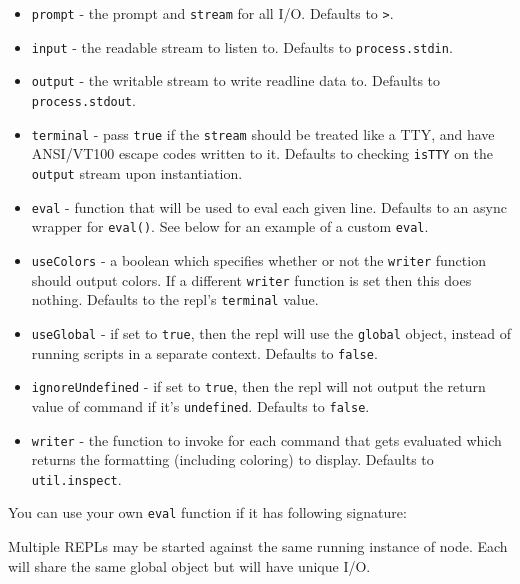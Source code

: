 \begin{itemize}
\item
  \texttt{prompt} - the prompt and \texttt{stream} for all I/O. Defaults
  to \texttt{\textgreater{}}.
\item
  \texttt{input} - the readable stream to listen to. Defaults to
  \texttt{process.stdin}.
\item
  \texttt{output} - the writable stream to write readline data to.
  Defaults to \texttt{process.stdout}.
\item
  \texttt{terminal} - pass \texttt{true} if the \texttt{stream} should
  be treated like a TTY, and have ANSI/VT100 escape codes written to it.
  Defaults to checking \texttt{isTTY} on the \texttt{output} stream upon
  instantiation.
\item
  \texttt{eval} - function that will be used to eval each given line.
  Defaults to an async wrapper for \texttt{eval()}. See below for an
  example of a custom \texttt{eval}.
\item
  \texttt{useColors} - a boolean which specifies whether or not the
  \texttt{writer} function should output colors. If a different
  \texttt{writer} function is set then this does nothing. Defaults to
  the repl's \texttt{terminal} value.
\item
  \texttt{useGlobal} - if set to \texttt{true}, then the repl will use
  the \texttt{global} object, instead of running scripts in a separate
  context. Defaults to \texttt{false}.
\item
  \texttt{ignoreUndefined} - if set to \texttt{true}, then the repl will
  not output the return value of command if it's \texttt{undefined}.
  Defaults to \texttt{false}.
\item
  \texttt{writer} - the function to invoke for each command that gets
  evaluated which returns the formatting (including coloring) to
  display. Defaults to \texttt{util.inspect}.
\end{itemize}

You can use your own \texttt{eval} function if it has following
signature:

\begin{Shaded}
\begin{Highlighting}[]
 
\NormalTok{\}}
\end{Highlighting}
\end{Shaded}

Multiple REPLs may be started against the same running instance of node.
Each will share the same global object but will have unique I/O.

